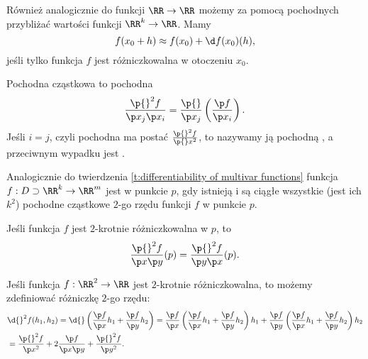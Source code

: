 Również analogicznie do funkcji $\RR \to \RR$ możemy za pomocą pochodnych przybliżać wartości funkcji $\RR^k \to \RR$. Mamy
\begin{equation}
    f(x_0 + h) \approx f(x_0) + \d f(x_0)(h),
\end{equation}
jeśli tylko funkcja $f$ jest różniczkowalna w otoczeniu $x_0$.

Pochodna cząstkowa  to pochodna
\[ \frac{\p{}^2 f}{\p x_j \p x_i} = \frac{\p{}}{\p x_j}\left(\frac{\p f}{\p x_i}\right). \]
Jeśli $i = j$, czyli pochodna ma postać $\frac{\p{}^2 f}{\p{} x^2}$, to nazywamy ją pochodną , a przeciwnym wypadku jest .

Analogicznie do twierdzenia \ref{t:differentiability of multivar functions} funkcja $f: D \supset \RR^k \to \RR^m$ jest  w punkcie $p$, gdy istnieją i są ciągłe wszystkie (jest ich $k^2$) pochodne cząstkowe $2$-go rzędu funkcji $f$ w punkcie $p$.

\begin{theorem}
    Jeśli funkcja $f$ jest $2$-krotnie różniczkowalna w $p$, to
    \[ \frac{\p{}^2 f}{\p x \p y}(p) = \frac{\p{}^2 f}{\p y \p x}(p). \]
\end{theorem}

Jeśli funkcja $f:\RR^2 \to \RR$ jest $2$-krotnie różniczkowalna, to możemy zdefiniować różniczkę $2$-go rzędu:
\begin{align*}
    &\d{}^2 f(h_1, h_2) = \d{} \left(\frac{\p f}{\p x} h_1 + \frac{\p f}{\p y} h_2\right) = \frac{\p f}{\p x}\left(\frac{\p f}{\p x} h_1 + \frac{\p f}{\p y} h_2\right)h_1 + \frac{\p f}{\p y}\left(\frac{\p f}{\p x} h_1 + \frac{\p f}{\p y} h_2\right)h_2 \\
    &= \frac{\p{}^2 f}{\p x^2} + 2\frac{\p f}{\p x\p y} + \frac{\p{}^2 f}{\p y^2}.
\end{align*}